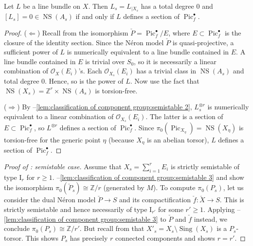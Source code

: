 \documentclass[reqno, letterpaper]{amsart}
\numberwithin{equation}{subsection}
\let\to\longrightarrow
\newcommand{\ZZ}{\mathbb{Z}}
\DeclareMathOperator{\Pic}{Pic}
\DeclareMathOperator{\NS}{NS}
\DeclareMathOperator{\Sing}{Sing}
\begin{document}
			\begin{lemma} \label{lem:classification of component group:semistable 3}
				Let $L$ be a line bundle on $X$. Then $L_s = L_{|X_s}$ has a total degree $0$ and $[L_s] = 0 \in \NS(A_s)$ if and only if $L$ defines a section of $\Pic^\bullet_f$.
			\end{lemma}
			\begin{proof}
				($\Longleftarrow$) Recall from  the isomorphism $\check P = \Pic^\bullet_f / E$, where $E \subset \Pic^\bullet_f$ is the closure of the identity section. Since the N\'eron model $\check P$ is quasi-projective, a sufficient power of $L$ is numerically equivalent to a line bundle contained in $E$. A line bundle contained in $E$ is trivial over $S_0$, so it is necessarily a linear combination of $\mathcal O_X(E_i)$'s. Each $\mathcal O_{X_s}(E_i)$ has a trivial class in $\NS(A_s)$ and total degree $0$. Hence, so is the power of $L$. Now use the fact that $\NS(X_s) = \ZZ^r \times \NS(A_s)$ is torsion-free.
				
				($\Longrightarrow$) By --\ref{lem:classification of component group:semistable 2}, $L_s^{\otimes r}$ is numerically equivalent to a linear combination of $\mathcal O_{X_s} (E_i)$. The latter is a section of $E \subset \Pic^\bullet_f$, so $L^{\otimes r}$ defines a section of $\Pic^\bullet_f$. Since $\pi_0 (\Pic_{X_\eta}) = \NS(X_{\eta})$ is torsion-free for the generic point $\eta$ (because $X_\eta$ is an abelian torsor), $L$ defines a section of $\Pic^\bullet_f$.
			\end{proof}
			
			\begin{proof}[Proof of : semistable case]
				Assume that $X_s = \sum_{i=1}^r E_i$ is strictly semistable of type $\mathrm I_r$ for $r \ge 1$. --\ref{lem:classification of component group:semistable 3} and  show the isomorphism $\pi_0 (\check P_s) \cong \ZZ/r$ (generated by $M$). To compute $\pi_0(P_s)$, let us consider the dual N\'eron model $\check P \to S$ and its compactification $\check f : \check X \to S$. This is strictly semistable and hence necessarily of type $\mathrm I_{r'}$ for some $r' \ge 1$. Applying --\ref{lem:classification of component group:semistable 3} to $\check P$ and $\check f$ instead, we conclude $\pi_0(P_s) \cong \ZZ/r'$. But recall from  that $X'_s = X_s \setminus \Sing(X_s)$ is a $P_s$-torsor. This shows $P_s$ has precisely $r$ connected components and shows $r = r'$.
			\end{proof}
			
\end{document}
